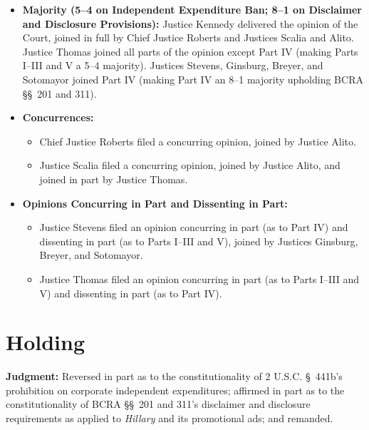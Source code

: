 \documentclass[12pt]{article}
\begin{document}
\begin{itemize}
  \item \textbf{Majority (5--4 on Independent Expenditure Ban; 8--1 on Disclaimer and Disclosure Provisions):} Justice Kennedy delivered the opinion of the Court, joined in full by Chief Justice Roberts and Justices Scalia and Alito. Justice Thomas joined all parts of the opinion except Part IV (making Parts I--III and V a 5--4 majority). Justices Stevens, Ginsburg, Breyer, and Sotomayor joined Part IV (making Part IV an 8--1 majority upholding BCRA \S\S~201 and 311).
  \item \textbf{Concurrences:}
  \begin{itemize}
    \item Chief Justice Roberts filed a concurring opinion, joined by Justice Alito.
    \item Justice Scalia filed a concurring opinion, joined by Justice Alito, and joined in part by Justice Thomas.
  \end{itemize}
  \item \textbf{Opinions Concurring in Part and Dissenting in Part:}
  \begin{itemize}
    \item Justice Stevens filed an opinion concurring in part (as to Part IV) and dissenting in part (as to Parts I--III and V), joined by Justices Ginsburg, Breyer, and Sotomayor.
    \item Justice Thomas filed an opinion concurring in part (as to Parts I--III and V) and dissenting in part (as to Part IV).
  \end{itemize}
\end{itemize}

\section{Holding}

\textbf{Judgment:} Reversed in part as to the constitutionality of 2 U.S.C. \S~441b's prohibition on corporate independent expenditures; affirmed in part as to the constitutionality of BCRA \S\S~201 and 311's disclaimer and disclosure requirements as applied to \textit{Hillary} and its promotional ads; and remanded.
\end{document}
